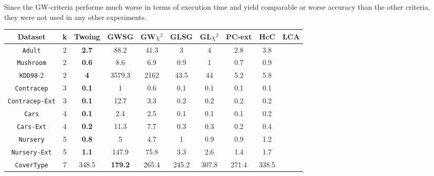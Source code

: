 Since the GW-criteria performe much worse in terms of execution time and yield comparable or worse accuracy than the other criteria, they were not used in any other experiments.

\begin{table*}[]
\small
\centering
\begin{tabular}{c|c|c|c|c|c|c|c|c|c}
Dataset             & k  & Twoing     & GWSG       & GW$\chi^2$  & GLSG      & GL$\chi^2$ & PC-ext     & HcC        & LCA        \\
\hline
{\tt Adult}         & 2  & {\bf 2.7}  & 88.2       & 41.3        & 3         & 4          & 2.8        & 3.8        &            \\
{\tt Mushroom}      & 2  & {\bf 0.6}  & 8.6        & 6.9         & 0.9       & 1          & 0.7        & 0.9        &            \\
{\tt KDD98}-2       & 2  & {\bf 4}    & 3579.3     & 2162        & 43.5      & 44         & 5.2        & 5.8        &            \\
{\tt Contracep}     & 3  & {\bf 0.1}  & 1          & 0.6         & 0.1       & 0.1        & 0.1        & 0.1        &            \\
{\tt Contracep-Ext} & 3  & {\bf 0.1}  & 12.7       & 3.3         & 0.2       & 0.2        & 0.2        & 0.2        &            \\
{\tt Cars}          & 4  & {\bf 0.1}  & 2.4        & 2.5         & 0.1       & 0.1        & 0.1        & 0.2        &            \\
{\tt Cars-Ext}      & 4  & {\bf 0.2}  & 11.3       & 7.7         & 0.3       & 0.3        & 0.2        & 0.4        &            \\
{\tt Nursery}       & 5  & {\bf 0.8}  & 5          & 4.7         & 1         & 0.9        & 0.9        & 1.2        &            \\
{\tt Nursery-Ext}   & 5  & {\bf 1.1}  & 147.9      & 75.8        & 3.3       & 2.6        & 1.4        & 1.7        &            \\
{\tt CoverType}     & 7  & 348.5      & {\bf 179.2}&  265.4      & 245.2     & 307.8      & 271.4      & 338.5      &            \\

\end{tabular}
\end{table*}
